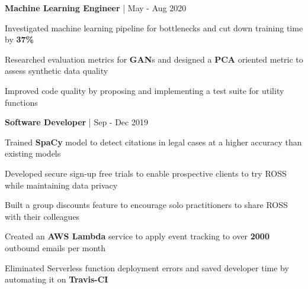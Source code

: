 


\begin{cventries}


\cventry
{\textbf{Machine Learning Engineer} | \color{awesome}{PerkinElmer}}
{May - Aug 2020} %
{ %
\begin{cvitems}
\item {Investigated machine learning pipeline for bottlenecks and cut down training time by \textbf{37\%}}
\item {Researched evaluation metrics for \textbf{GAN}s and designed a \textbf{PCA} oriented metric to assess synthetic data quality}
\item {Improved code quality by proposing and implementing a test suite for utility functions}
\end{cvitems}
}


\cventry
{\textbf{Software Developer} | \color{awesome}{ROSS Intelligence}}
{Sep - Dec 2019} %
{ %
\begin{cvitems}
\item {Trained \textbf{SpaCy} model to detect citations in legal cases at a higher accuracy than existing models}
\item {Developed secure sign-up free trials to enable prospective clients to try ROSS while maintaining data privacy}
\item {Built a group discounts feature to encourage solo practitioners to share ROSS with their colleagues}
\item {Created an \textbf{AWS Lambda} service to apply event tracking to over \textbf{2000} outbound emails per month}
\item {Eliminated Serverless function deployment errors and saved developer time by automating it on \textbf{Travis-CI}}
\end{cvitems}
}


\end{cventries}
